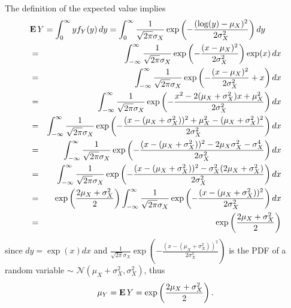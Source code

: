 \documentclass[10pt, twoside]{book}   	%
\begin{document}
The definition of the expected value implies
\begin{eqnarray*}
\lefteqn{
\Expect Y = \int_{0}^{\infty} y f_Y(y) \, dy
= \int_{0}^{\infty} \frac{1}{\sqrt{2\pi} \sigma_X }  \exp\left(-\frac{(\log(y)-\mu_X)^2}{2\sigma_X^2}\right) dy
}
\\
&=&
\int_{-\infty}^{\infty} \frac{1}{\sqrt{2\pi} \sigma_X }  \exp\left(-\frac{(x-\mu_X)^2}{2\sigma_X^2}\right) \exp(x) \, dx
\\
&=&
\int_{-\infty}^{\infty} \frac{1}{\sqrt{2\pi} \sigma_X }  \exp\left(-\frac{(x-\mu_X)^2}{2\sigma_X^2}+x\right) dx
\\
&=&
\int_{-\infty}^{\infty} \frac{1}{\sqrt{2\pi} \sigma_X }  \exp\left(-\frac{x^2 - 2(\mu_X +\sigma_X^2)x + \mu_X^2}{2\sigma_X^2}\right) dx
\\
&=&
\int_{-\infty}^{\infty} \frac{1}{\sqrt{2\pi} \sigma_X }  \exp\left(-\frac{(x - (\mu_X +\sigma_X^2))^2 + \mu_X^2 -(\mu_X+\sigma_X^2)^2}{2\sigma_X^2}\right) dx
\\
&=&
\int_{-\infty}^{\infty} \frac{1}{\sqrt{2\pi} \sigma_X }  \exp\left(-\frac{(x - (\mu_X +\sigma_X^2))^2 - 2\mu_X\sigma_X^2 - \sigma_X^4}{2\sigma_X^2}\right) dx
\\
&=&
\int_{-\infty}^{\infty} \frac{1}{\sqrt{2\pi} \sigma_X }  \exp\left(-\frac{(x - (\mu_X +\sigma_X^2))^2 - \sigma_X^2(2\mu_X+ \sigma_X^2)}{2\sigma_X^2}\right) dx
\\
&=&
\exp\left(\frac{2\mu_X+ \sigma_X^2}{2}\right)
\int_{-\infty}^{\infty} \frac{1}{\sqrt{2\pi} \sigma_X }  \exp\left(-\frac{(x - (\mu_X +\sigma_X^2))^2 }{2\sigma_X^2}\right) dx
\\
&=&
\exp\left(\frac{2\mu_X+ \sigma_X^2}{2}\right)
\end{eqnarray*}
since $dy = \exp(x) dx$
and $\frac{1}{\sqrt{2\pi} \sigma_X }  \exp\left(-\frac{(x - (\mu_X +\sigma_X^2))^2 }{2\sigma_X^2}\right)$
is the PDF of a random variable $\sim$ $\mathcal{N}(\mu_X+\sigma_X^2,\sigma_X^2)$,
thus
\begin{equation}
\label{eq:log-normal-mean}
\mu_Y
= \mathop{\bf E{}} Y = \exp\left(\frac{2\mu_X+ \sigma_X^2}{2}\right).
\end{equation}
\end{document}
